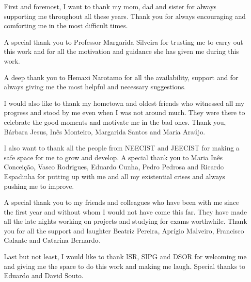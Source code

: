 
First and foremost, I want to thank my mom, dad and sister for always supporting me throughout all these years. Thank you for always encouraging and comforting me in the most difficult times.

A special thank you to Professor Margarida Silveira for trusting me to carry out this work and for all the motivation and guidance she has given me during this work. 

A deep thank you to Hemaxi Narotamo for all the availability, support and for always giving me the most helpful and necessary suggestions.

I would also like to thank my hometown and oldest friends who witnessed all my progress and stood by me even when I was not around much. They were there to celebrate the good moments and motivate me in the bad ones. Thank you, Bárbara Jesus, Inês Monteiro, Margarida Santos and Maria Araújo.

I also want to thank all the people from NEECIST and JEECIST for making a safe space for me to grow and develop. A special thank you to Maria Inês Conceição, Vasco Rodrigues, Eduardo Cunha, Pedro Pedrosa and Ricardo Espadinha for putting up with me and all my existential crises and always pushing me to improve.

A special thank you to my friends and colleagues who have been with me since the first year and without whom I would not have come this far. They have made all the late nights working on projects and studying for exams worthwhile. Thank you for all the support and laughter Beatriz Pereira, Aprígio Malveiro, Francisco Galante and Catarina Bernardo.

Last but not least, I would like to thank ISR, SIPG and DSOR for welcoming me and giving me the space to do this work and making me laugh. Special thanks to Eduardo and David Souto.
